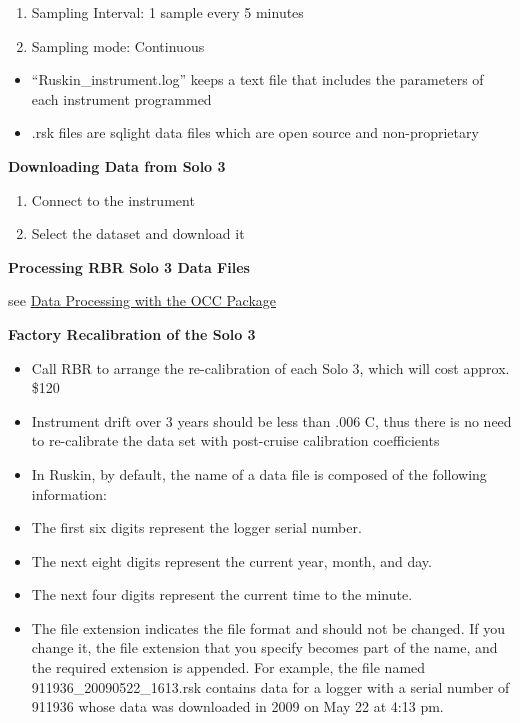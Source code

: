 \documentclass[]{book}
\begin{document}
\begin{enumerate}
\def\labelenumi{\alph{enumi}.}
\item
  Sampling Interval: 1 sample every 5 minutes
\item
  Sampling mode: Continuous
\end{enumerate}

\begin{itemize}
\item
  ``Ruskin\_instrument.log'' keeps a text file that includes the
  parameters of each instrument programmed
\item
  .rsk files are sqlight data files which are open source and
  non-proprietary
\end{itemize}

\textbf{Downloading Data from Solo 3}

\begin{enumerate}
\def\labelenumi{\arabic{enumi}.}
\item
  Connect to the instrument
\item
  Select the dataset and download it
\end{enumerate}

\textbf{Processing RBR Solo 3 Data Files}

see \protect\hyperlink{data_processing}{Data Processing with the OCC
Package}

\textbf{Factory Recalibration of the Solo 3}

\begin{itemize}
\item
  Call RBR to arrange the re-calibration of each Solo 3, which will cost
  approx. \$120
\item
  Instrument drift over 3 years should be less than .006 C, thus there
  is no need to re-calibrate the data set with post-cruise calibration
  coefficients
\item
  In Ruskin, by default, the name of a data file is composed of the
  following information:
\item
  The first six digits represent the logger serial number.
\item
  The next eight digits represent the current year, month, and day.
\item
  The next four digits represent the current time to the minute.
\item
  The file extension indicates the file format and should not be
  changed. If you change it, the file extension that you specify becomes
  part of the name, and the required extension is appended. For example,
  the file named 911936\_20090522\_1613.rsk contains data for a logger
  with a serial number of 911936 whose data was downloaded in 2009 on
  May 22 at 4:13 pm.
\end{itemize}
\end{document}
